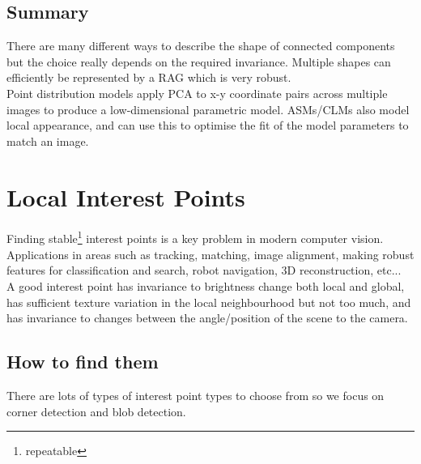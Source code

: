 \documentclass{article}
\begin{document}
	\subsection{Summary}
	There are many different ways to describe the shape of connected components but the choice really depends on the required invariance. Multiple shapes can efficiently be represented by a RAG which is very robust.\\
	Point distribution models apply PCA to x-y coordinate pairs across multiple images to produce a low-dimensional parametric model. ASMs/CLMs also model local appearance, and can use this to optimise the fit of the model parameters to match an image.
	
	\section{Local Interest Points}
	Finding stable\footnote{repeatable} interest points is a key problem in modern computer vision. Applications in areas such as tracking, matching, image alignment, making robust features for classification and search, robot navigation, 3D reconstruction, etc...\\
	A good interest point has invariance to brightness change both local and global, has sufficient texture variation in the local neighbourhood but not too much, and has invariance to changes between the angle/position of the scene to the camera.
	\subsection{How to find them}
	There are lots of types of interest point types to choose from so we focus on corner detection and blob detection.
\end{document}
